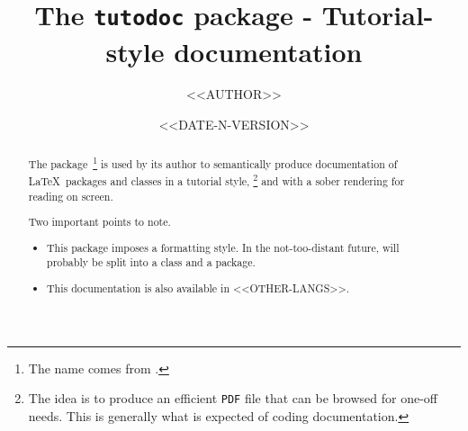 \documentclass[10pt, a4paper]{article}
\begin{document}
\title{The \texttt{tutodoc} package - Tutorial-style documentation}
\author{<<AUTHOR>>}
\date{<<DATE-N-VERSION>>}

\maketitle

\begin{abstract}
    The \thispack{} package\,%
    \footnote{
        The name comes from .
    }
    is used by its author to semantically produce documentation of \LaTeX\ packages and classes in a tutorial style,%
    \footnote{
        The idea is to produce an efficient \texttt{PDF} file that can be browsed for one-off needs. This is generally what is expected of coding documentation.
    }
    and with a sober rendering for reading on screen.

    \medskip

    Two important points to note.
    \begin{itemize}
        \item This package imposes a formatting style. In the not-too-distant future, \thispack{} will probably be split into a class and a package.

        \item This documentation is also available in <<OTHER-LANGS>>.
    \end{itemize}
\end{abstract}
\end{document}
